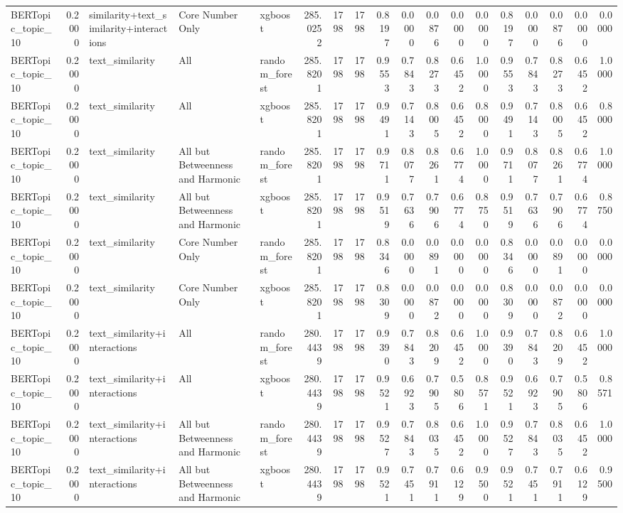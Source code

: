 \begin{tabular}{lrlllrrrrrrrrrrrrr}
BERTopic_topic_10 & 0.2000 & similarity+text_similarity+interactions & Core Number Only & xgboost & 285.0252 & 1798 & 1798 & 0.8197 & 0.0000 & 0.0876 & 0.0000 & 0.0000 & 0.8197 & 0.0000 & 0.0876 & 0.0000 & 0.0000 \\
BERTopic_topic_10 & 0.2000 & text_similarity & All & random_forest & 285.8201 & 1798 & 1798 & 0.9553 & 0.7843 & 0.8273 & 0.6452 & 1.0000 & 0.9553 & 0.7843 & 0.8273 & 0.6452 & 1.0000 \\
BERTopic_topic_10 & 0.2000 & text_similarity & All & xgboost & 285.8201 & 1798 & 1798 & 0.9491 & 0.7143 & 0.8005 & 0.6452 & 0.8000 & 0.9491 & 0.7143 & 0.8005 & 0.6452 & 0.8000 \\
BERTopic_topic_10 & 0.2000 & text_similarity & All but Betweenness and Harmonic & random_forest & 285.8201 & 1798 & 1798 & 0.9711 & 0.8077 & 0.8261 & 0.6774 & 1.0000 & 0.9711 & 0.8077 & 0.8261 & 0.6774 & 1.0000 \\
BERTopic_topic_10 & 0.2000 & text_similarity & All but Betweenness and Harmonic & xgboost & 285.8201 & 1798 & 1798 & 0.9519 & 0.7636 & 0.7906 & 0.6774 & 0.8750 & 0.9519 & 0.7636 & 0.7906 & 0.6774 & 0.8750 \\
BERTopic_topic_10 & 0.2000 & text_similarity & Core Number Only & random_forest & 285.8201 & 1798 & 1798 & 0.8346 & 0.0000 & 0.0891 & 0.0000 & 0.0000 & 0.8346 & 0.0000 & 0.0891 & 0.0000 & 0.0000 \\
BERTopic_topic_10 & 0.2000 & text_similarity & Core Number Only & xgboost & 285.8201 & 1798 & 1798 & 0.8309 & 0.0000 & 0.0872 & 0.0000 & 0.0000 & 0.8309 & 0.0000 & 0.0872 & 0.0000 & 0.0000 \\
BERTopic_topic_10 & 0.2000 & text_similarity+interactions & All & random_forest & 280.4439 & 1798 & 1798 & 0.9390 & 0.7843 & 0.8209 & 0.6452 & 1.0000 & 0.9390 & 0.7843 & 0.8209 & 0.6452 & 1.0000 \\
BERTopic_topic_10 & 0.2000 & text_similarity+interactions & All & xgboost & 280.4439 & 1798 & 1798 & 0.9521 & 0.6923 & 0.7905 & 0.5806 & 0.8571 & 0.9521 & 0.6923 & 0.7905 & 0.5806 & 0.8571 \\
BERTopic_topic_10 & 0.2000 & text_similarity+interactions & All but Betweenness and Harmonic & random_forest & 280.4439 & 1798 & 1798 & 0.9527 & 0.7843 & 0.8035 & 0.6452 & 1.0000 & 0.9527 & 0.7843 & 0.8035 & 0.6452 & 1.0000 \\
BERTopic_topic_10 & 0.2000 & text_similarity+interactions & All but Betweenness and Harmonic & xgboost & 280.4439 & 1798 & 1798 & 0.9521 & 0.7451 & 0.7911 & 0.6129 & 0.9500 & 0.9521 & 0.7451 & 0.7911 & 0.6129 & 0.9500 \\

\end{tabular}
